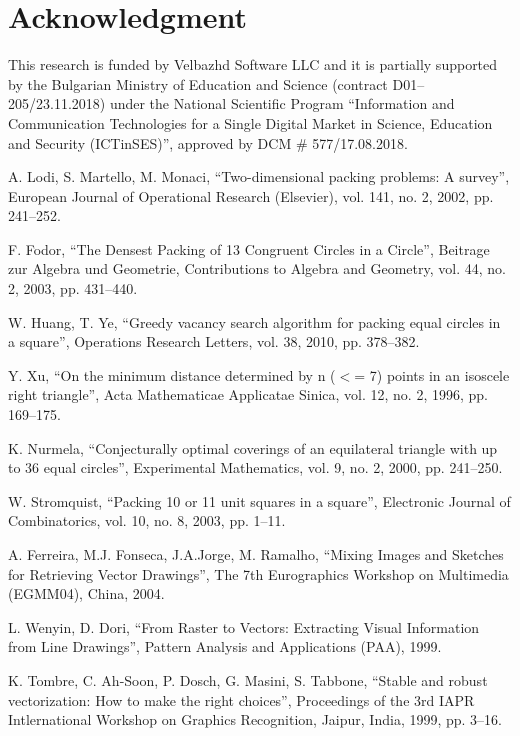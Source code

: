 \documentclass[conference]{IEEEtran}
\begin{document}
\section*{Acknowledgment}

This research is funded by Velbazhd Software LLC and it is partially supported by the Bulgarian Ministry of Education and Science (contract D01–205/23.11.2018) under the National Scientific Program ``Information and Communication Technologies for a Single Digital Market in Science, Education and Security (ICTinSES)'', approved by DCM \# 577/17.08.2018.

\begin{thebibliography}{00}

 A. Lodi, S. Martello, M. Monaci, ``Two-dimensional packing problems: A survey'', European Journal of Operational Research (Elsevier), vol. 141, no. 2, 2002, pp. 241--252.

 F. Fodor, ``The Densest Packing of 13 Congruent Circles in a Circle'', Beitrage zur Algebra und Geometrie, Contributions to Algebra and Geometry, vol. 44, no. 2, 2003, pp. 431--440.

 W. Huang, T. Ye, ``Greedy vacancy search algorithm for packing equal circles in a square'', Operations Research Letters, vol. 38, 2010, pp. 378--382.

 Y. Xu, ``On the minimum distance determined by n ($<$= 7) points in an isoscele right triangle'', Acta Mathematicae Applicatae Sinica, vol. 12, no. 2, 1996, pp. 169--175.

 K. Nurmela, ``Conjecturally optimal coverings of an equilateral triangle with up to 36 equal circles'', Experimental Mathematics, vol. 9, no. 2, 2000, pp. 241--250.

 W. Stromquist, ``Packing 10 or 11 unit squares in a square'', Electronic Journal of Combinatorics, vol. 10, no. 8, 2003, pp. 1--11.

 A. Ferreira, M.J. Fonseca, J.A.Jorge, M. Ramalho, ``Mixing Images and Sketches for Retrieving Vector Drawings'', The 7th Eurographics Workshop on Multimedia (EGMM04), China, 2004.

 L. Wenyin, D. Dori, ``From Raster to Vectors: Extracting Visual Information from Line Drawings'', Pattern Analysis and Applications (PAA), 1999.

 K. Tombre, C. Ah-Soon, P. Dosch, G. Masini, S. Tabbone, ``Stable and robust vectorization: How to make the right choices'', Proceedings of the 3rd IAPR Intlernational Workshop on Graphics Recognition, Jaipur, India, 1999, pp. 3--16.


\end{thebibliography}
\end{document}
